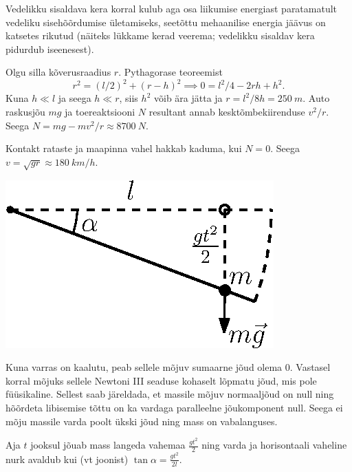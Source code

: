 \documentclass[10pt, twoside]{article}
\begin{document}
{Vedelikku sisaldava kera korral kulub aga osa liikumise energiast paratamatult
vedeliku sisehõõrdumise ületamiseks, seetõttu mehaanilise energia jäävus on katsetes
rikutud (näiteks lükkame kerad veerema; vedelikku sisaldav kera pidurdub iseenesest).
\probend
\bigskip


\solu
Olgu
silla kõverusraadius $r$. Pythagorase teoreemist
\[
r^2=(l/2)^2+(r-h)^2\implies 0=l^2/4-2rh+h^2.
\]
Kuna $h\ll l$ ja seega $h\ll r$, siis $h^2$ võib ära jätta ja $r=l^2/8h=\SI{250}{m}$.
Auto raskusjõu $mg$ ja toereaktsiooni $N$ resultant annab kesktõmbekiirenduse $v^2/r$.
Seega $N=mg-mv^2/r\approx\SI{8700}{N}$.

Kontakt rataste ja maapinna vahel hakkab kaduma, kui $N=0$. Seega $v=\sqrt{gr}\approx
\SI{180}{km/h}$.
\probend
\bigskip


\solu
\begin{center}
	\includegraphics[width = 0.5\linewidth]{2011-v3g-02-varras_lah.eps}
\end{center}

Kuna varras on kaalutu, peab sellele mõjuv sumaarne jõud olema \num{0}. Vastasel korral mõjuks sellele Newtoni III seaduse kohaselt lõpmatu jõud, mis pole füüsikaline. Sellest saab järeldada, et massile mõjuv normaaljõud on null ning hõõrdeta libisemise tõttu on ka vardaga paralleelne jõukomponent null. Seega ei mõju massile varda poolt ükski jõud ning mass on vabalanguses. 

Aja $t$ jooksul jõuab mass langeda vahemaa $\frac{gt^2}{2}$ ning varda ja horisontaali vaheline nurk avaldub kui (vt joonist) $\tan\alpha = \frac{gt^2}{2l}$.
\probend
\bigskip


}
\end{document}

